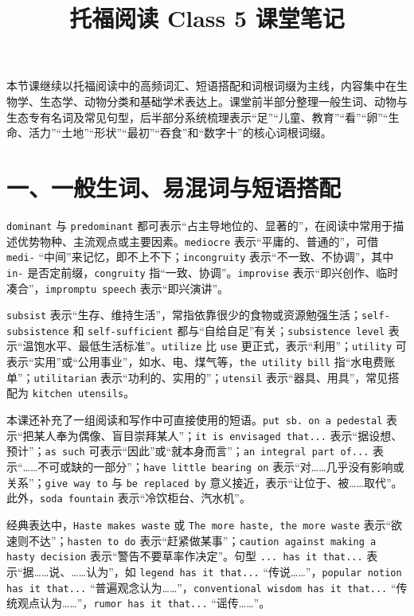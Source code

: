 \documentclass[UTF8,zihao=-4]{ctexart}
\title{\heiti 托福阅读 Class 5 课堂笔记}
\author{}
\date{}
\begin{document}
\maketitle
\thispagestyle{fancy}

本节课继续以托福阅读中的高频词汇、短语搭配和词根词缀为主线，内容集中在生物学、生态学、动物分类和基础学术表达上。课堂前半部分整理一般生词、动物与生态专有名词及常见句型，后半部分系统梳理表示“足”“儿童、教育”“看”“卵”“生命、活力”“土地”“形状”“最初”“吞食”和“数字十”的核心词根词缀。

\section*{一、一般生词、易混词与短语搭配}

\texttt{dominant} 与 \texttt{predominant} 都可表示“占主导地位的、显著的”，在阅读中常用于描述优势物种、主流观点或主要因素。\texttt{mediocre} 表示“平庸的、普通的”，可借 \texttt{medi-} “中间”来记忆，即不上不下；\texttt{incongruity} 表示“不一致、不协调”，其中 \texttt{in-} 是否定前缀，\texttt{congruity} 指“一致、协调”。\texttt{improvise} 表示“即兴创作、临时凑合”，\texttt{impromptu speech} 表示“即兴演讲”。

\texttt{subsist} 表示“生存、维持生活”，常指依靠很少的食物或资源勉强生活；\texttt{self-subsistence} 和 \texttt{self-sufficient} 都与“自给自足”有关；\texttt{subsistence level} 表示“温饱水平、最低生活标准”。\texttt{utilize} 比 \texttt{use} 更正式，表示“利用”；\texttt{utility} 可表示“实用”或“公用事业”，如水、电、煤气等，\texttt{the utility bill} 指“水电费账单”；\texttt{utilitarian} 表示“功利的、实用的”；\texttt{utensil} 表示“器具、用具”，常见搭配为 \texttt{kitchen utensils}。

本课还补充了一组阅读和写作中可直接使用的短语。\texttt{put sb. on a pedestal} 表示“把某人奉为偶像、盲目崇拜某人”；\texttt{it is envisaged that...} 表示“据设想、预计”；\texttt{as such} 可表示“因此”或“就本身而言”；\texttt{an integral part of...} 表示“……不可或缺的一部分”；\texttt{have little bearing on} 表示“对……几乎没有影响或关系”；\texttt{give way to} 与 \texttt{be replaced by} 意义接近，表示“让位于、被……取代”。此外，\texttt{soda fountain} 表示“冷饮柜台、汽水机”。

经典表达中，\texttt{Haste makes waste} 或 \texttt{The more haste, the more waste} 表示“欲速则不达”；\texttt{hasten to do} 表示“赶紧做某事”；\texttt{caution against making a hasty decision} 表示“警告不要草率作决定”。句型 \texttt{... has it that...} 表示“据……说、……认为”，如 \texttt{legend has it that...} “传说……”，\texttt{popular notion has it that...} “普遍观念认为……”，\texttt{conventional wisdom has it that...} “传统观点认为……”，\texttt{rumor has it that...} “谣传……”。
\end{document}
